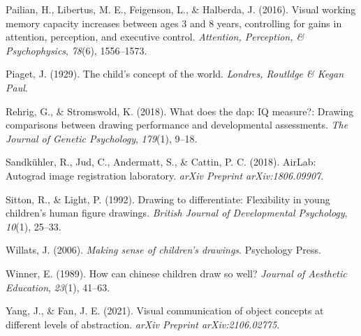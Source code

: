 \documentclass[
  english,
  man]{apa6}
\begin{document}
\leavevmode\hypertarget{ref-pailian2016visual}{}%
Pailian, H., Libertus, M. E., Feigenson, L., \& Halberda, J. (2016). Visual working memory capacity increases between ages 3 and 8 years, controlling for gains in attention, perception, and executive control. \emph{Attention, Perception, \& Psychophysics}, \emph{78}(6), 1556--1573.

\leavevmode\hypertarget{ref-piaget1929child}{}%
Piaget, J. (1929). The child's concept of the world. \emph{Londres, Routldge \& Kegan Paul}.

\leavevmode\hypertarget{ref-rehrig2018does}{}%
Rehrig, G., \& Stromswold, K. (2018). What does the dap: IQ measure?: Drawing comparisons between drawing performance and developmental assessments. \emph{The Journal of Genetic Psychology}, \emph{179}(1), 9--18.

\leavevmode\hypertarget{ref-sandkuhler2018}{}%
Sandkühler, R., Jud, C., Andermatt, S., \& Cattin, P. C. (2018). AirLab: Autograd image registration laboratory. \emph{arXiv Preprint arXiv:1806.09907}.

\leavevmode\hypertarget{ref-sitton1992drawing}{}%
Sitton, R., \& Light, P. (1992). Drawing to differentiate: Flexibility in young children's human figure drawings. \emph{British Journal of Developmental Psychology}, \emph{10}(1), 25--33.

\leavevmode\hypertarget{ref-willats2006making}{}%
Willats, J. (2006). \emph{Making sense of children's drawings}. Psychology Press.

\leavevmode\hypertarget{ref-winner1989can}{}%
Winner, E. (1989). How can chinese children draw so well? \emph{Journal of Aesthetic Education}, \emph{23}(1), 41--63.

\leavevmode\hypertarget{ref-yang2021visual}{}%
Yang, J., \& Fan, J. E. (2021). Visual communication of object concepts at different levels of abstraction. \emph{arXiv Preprint arXiv:2106.02775}.

\endgroup
\end{document}
